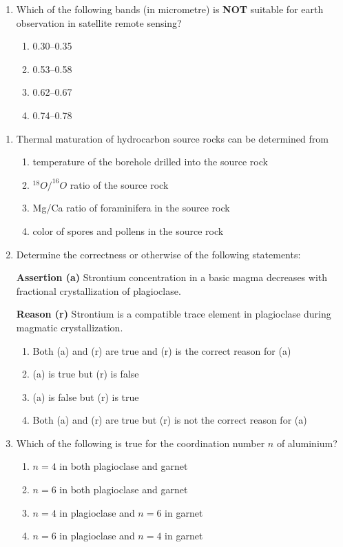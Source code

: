 \documentclass[journal,12pt,onecolumn]{IEEEtran}
\theoremstyle{remark}
\begin{document}
\begin{enumerate}
\item Which of the following bands (in micrometre) is \textbf{NOT} suitable for earth observation in satellite remote sensing?
\begin{multicols}{4}
\begin{enumerate}
\item 0.30--0.35  
\item 0.53--0.58  
\item 0.62--0.67  
\item 0.74--0.78  
\end{enumerate}
\end{multicols}

\end{enumerate}


\begin{enumerate}[resume]

\item Thermal maturation of hydrocarbon source rocks can be determined from
\begin{enumerate}
\item temperature of the borehole drilled into the source rock  
\item \(^{18}O/^{16}O\) ratio of the source rock  
\item Mg/Ca ratio of foraminifera in the source rock  
\item color of spores and pollens in the source rock  
\end{enumerate}

\item Determine the correctness or otherwise of the following statements:

\textbf{Assertion (a)} Strontium concentration in a basic magma decreases with fractional crystallization of plagioclase.

\textbf{Reason (r)} Strontium is a compatible trace element in plagioclase during magmatic crystallization.

\begin{enumerate}
\item Both (a) and (r) are true and (r) is the correct reason for (a)  
\item (a) is true but (r) is false  
\item (a) is false but (r) is true  
\item Both (a) and (r) are true but (r) is not the correct reason for (a)  
\end{enumerate}

\item Which of the following is true for the coordination number \(n\) of aluminium?
\begin{enumerate}
\item \(n = 4\) in both plagioclase and garnet  
\item \(n = 6\) in both plagioclase and garnet  
\item \(n = 4\) in plagioclase and \(n = 6\) in garnet  
\item \(n = 6\) in plagioclase and \(n = 4\) in garnet  
\end{enumerate}


\end{enumerate}
\end{document}

